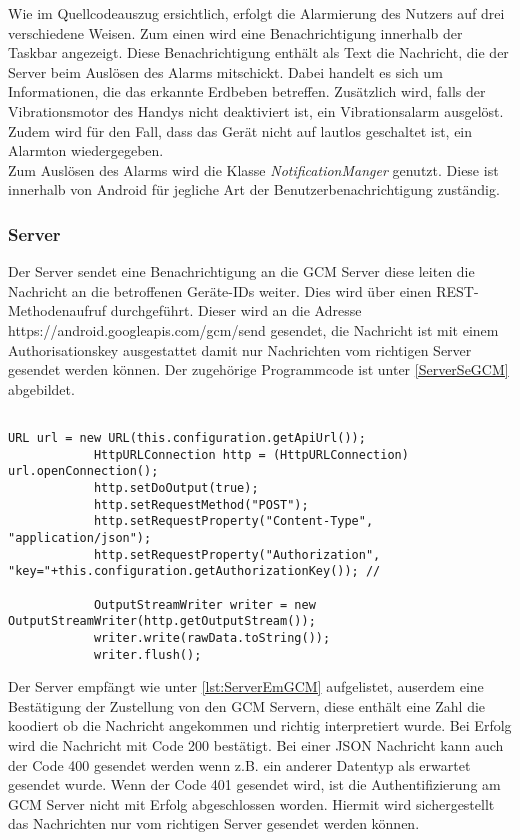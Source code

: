 Wie im Quellcodeauszug ersichtlich, erfolgt die Alarmierung des Nutzers auf drei verschiedene Weisen. Zum einen wird eine Benachrichtigung innerhalb der Taskbar angezeigt. Diese Benachrichtigung enthält als Text die Nachricht, die der Server beim Auslösen des Alarms mitschickt. Dabei handelt es sich um Informationen, die das erkannte Erdbeben betreffen. Zusätzlich wird, falls der Vibrationsmotor des Handys nicht deaktiviert ist, ein Vibrationsalarm ausgelöst. Zudem wird für den Fall, dass das Gerät nicht auf lautlos geschaltet ist, ein Alarmton wiedergegeben.\\
Zum Auslösen des Alarms wird die Klasse \textit{NotificationManger} genutzt. Diese ist innerhalb von Android für jegliche Art der Benutzerbenachrichtigung zuständig.


\subsubsection{Server}
Der Server sendet eine Benachrichtigung an die GCM Server diese leiten die Nachricht an die betroffenen Geräte-IDs weiter. Dies wird über einen REST-Methodenaufruf durchgeführt. Dieser wird an die Adresse https://android.googleapis.com/gcm/send gesendet, die Nachricht ist mit einem Authorisationskey ausgestattet damit nur Nachrichten vom richtigen Server gesendet werden können. Der zugehörige Programmcode ist unter \ref{ServerSeGCM} abgebildet.

\begin{lstlisting}[caption={Senden von Nachrichten vom Server},label=lst:ServerSeGCM]

URL url = new URL(this.configuration.getApiUrl());
			HttpURLConnection http = (HttpURLConnection) url.openConnection();
			http.setDoOutput(true);
			http.setRequestMethod("POST");
			http.setRequestProperty("Content-Type", "application/json");
			http.setRequestProperty("Authorization", "key="+this.configuration.getAuthorizationKey()); //
			
			OutputStreamWriter writer = new OutputStreamWriter(http.getOutputStream());
			writer.write(rawData.toString());
			writer.flush();

\end{lstlisting}

Der Server empfängt wie unter \ref{lst:ServerEmGCM} aufgelistet, auserdem eine Bestätigung der Zustellung von den GCM Servern, diese enthält eine Zahl die koodiert ob die Nachricht angekommen und richtig interpretiert wurde. Bei Erfolg wird die Nachricht mit Code 200 bestätigt. Bei einer JSON Nachricht kann auch der Code 400 gesendet werden wenn z.B. ein anderer Datentyp als erwartet gesendet wurde. Wenn der Code 401 gesendet wird, ist die Authentifizierung am GCM Server nicht mit Erfolg abgeschlossen worden. Hiermit wird sichergestellt das Nachrichten nur vom richtigen Server gesendet werden können. 


